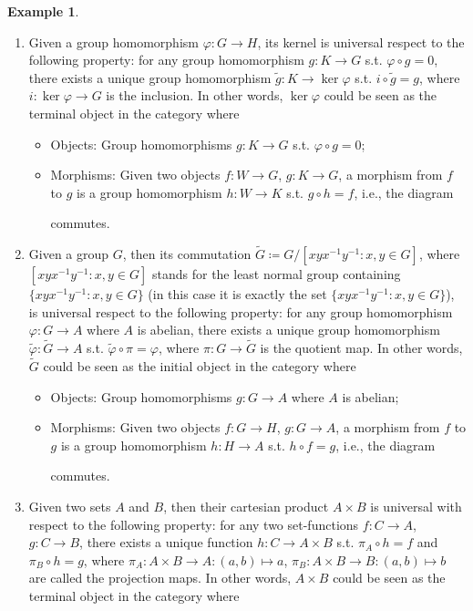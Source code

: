 \documentclass{article}
\theoremstyle{definition}
\theoremstyle{definition}
\newtheorem{example}{Example}[section]
\theoremstyle{remark}
\begin{document}
\begin{example}
	\begin{enumerate}[label=(\roman*)]
		\item Given a group homomorphism $\varphi:G\to H$, its kernel is universal respect to the following property: for any group homomorphism $g:K\to G$ s.t. $\varphi\circ g=0$, there exists a unique group homomorphism $\tilde g:K\to \ker \varphi$ s.t. $i\circ\tilde g=g$, where $i:\ker\varphi\to G$ is the inclusion. In other words, $\ker \varphi$ could be seen as the terminal object in the category where
			\begin{itemize}
				\item Objects: Group homomorphisms $g:K\to G$ s.t. $\varphi\circ g=0$;
				\item Morphisms: Given two objects $f:W\to G$, $g:K\to G$, a morphism from $f$ to $g$ is a group homomorphism $h:W\to K$ s.t. $g\circ h=f$, i.e., the diagram
				commutes.
			\end{itemize}
		\item Given a group $G$, then its commutation $\tilde G\coloneqq G/[xyx^{-1}y^{-1}:x,y\in G]$, where $[xyx^{-1}y^{-1}:x,y\in G]$ stands for the least normal group containing $\{xyx^{-1}y^{-1}:x,y\in G\}$ (in this case it is exactly the set $\{xyx^{-1}y^{-1}:x,y\in G\}$), is universal respect to the following property: for any group homomorphism $\varphi:G\to A$ where $A$ is abelian, there exists a unique group homomorphism $\tilde \varphi:\tilde G\to A$ s.t. $\tilde\varphi\circ\pi=\varphi$, where $\pi:G\to \tilde G$ is the quotient map. In other words, $\tilde G$ could be seen as the initial object in the category where
			\begin{itemize}
				\item Objects: Group homomorphisms $g:G\to A$ where $A$ is abelian;
				\item Morphisms: Given two objects $f:G\to H$, $g:G\to A$, a morphism from $f$ to $g$ is a group homomorphism $h:H\to A$ s.t. $h\circ f=g$, i.e., the diagram
				commutes.
				\end{itemize}
		\item Given two sets $A$ and $B$, then their cartesian product $A\times B$ is universal with respect to the following property: for any two set-functions $f:C\to A$, $g:C\to B$, there exists a unique function $h:C\to A\times B$ s.t. $\pi_A\circ h=f$ and $\pi_B\circ h=g$, where $\pi_A:A\times B\to A:(a,b)\mapsto a$, $\pi_B:A\times B\to B:(a,b)\mapsto b$ are called the projection maps. In other words, $A\times B$ could be seen as the terminal object in the category where

\end{enumerate}
\end{example}
\end{document}
